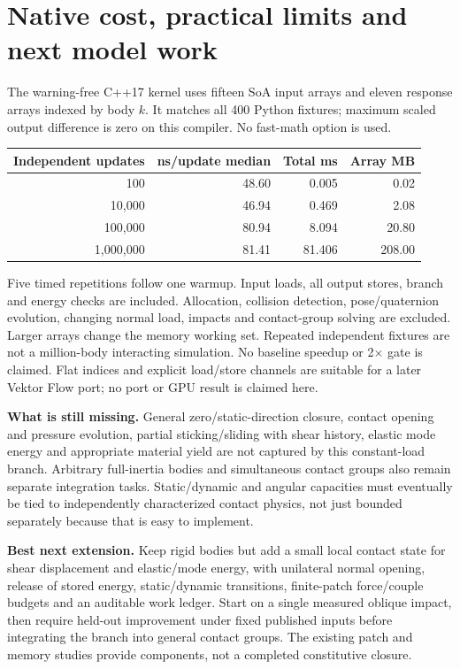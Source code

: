 \documentclass[10pt,a4paper]{article}
\begin{document}
\section*{Native cost, practical limits and next model work}
The warning-free C++17 kernel uses fifteen SoA input arrays and eleven response
arrays indexed by body $k$. It matches all 400 Python fixtures; maximum scaled
output difference is zero on this compiler. No fast-math option is used.

\begin{tabular}{rrrr}\hline
Independent updates & ns/update median & Total ms & Array MB\\\hline
100 & 48.60 & 0.005 & 0.02 \\
10,000 & 46.94 & 0.469 & 2.08 \\
100,000 & 80.94 & 8.094 & 20.80 \\
1,000,000 & 81.41 & 81.406 & 208.00 \\
\hline\end{tabular}

Five timed repetitions follow one warmup. Input loads, all output stores,
branch and energy checks are included. Allocation, collision detection,
pose/quaternion evolution, changing normal load, impacts and contact-group solving
are excluded. Larger arrays change the memory working set. Repeated independent
fixtures are not a million-body interacting simulation. No baseline speedup or
2$\times$ gate is claimed. Flat indices and explicit load/store channels are
suitable for a later Vektor Flow port; no port or GPU result is claimed here.

\textbf{What is still missing.} General zero/static-direction closure, contact
opening and pressure evolution, partial sticking/sliding with shear history,
elastic mode energy and appropriate material yield are not captured by this
constant-load branch. Arbitrary full-inertia bodies and simultaneous contact
groups also remain separate integration tasks. Static/dynamic and angular
capacities must eventually be tied to independently characterized contact physics,
not just bounded separately because that is easy to implement.

\textbf{Best next extension.} Keep rigid bodies but add a small local contact
state for shear displacement and elastic/mode energy, with unilateral normal
opening, release of stored energy, static/dynamic transitions, finite-patch
force/couple budgets and an auditable work ledger. Start on a single measured
oblique impact, then require held-out improvement under fixed published inputs
before integrating the branch into general contact groups. The existing patch
and memory studies provide components, not a completed constitutive closure.
\end{document}
